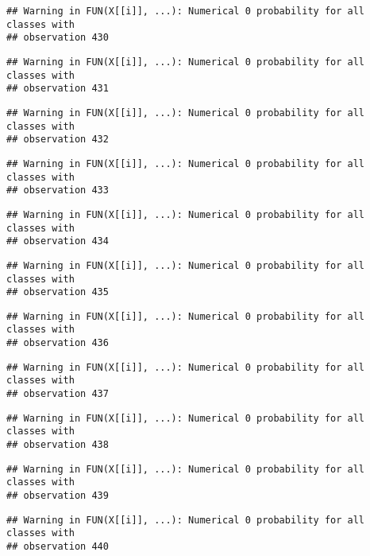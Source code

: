 \documentclass[
]{article}
\begin{document}
\begin{verbatim}
## Warning in FUN(X[[i]], ...): Numerical 0 probability for all classes with
## observation 430
\end{verbatim}

\begin{verbatim}
## Warning in FUN(X[[i]], ...): Numerical 0 probability for all classes with
## observation 431
\end{verbatim}

\begin{verbatim}
## Warning in FUN(X[[i]], ...): Numerical 0 probability for all classes with
## observation 432
\end{verbatim}

\begin{verbatim}
## Warning in FUN(X[[i]], ...): Numerical 0 probability for all classes with
## observation 433
\end{verbatim}

\begin{verbatim}
## Warning in FUN(X[[i]], ...): Numerical 0 probability for all classes with
## observation 434
\end{verbatim}

\begin{verbatim}
## Warning in FUN(X[[i]], ...): Numerical 0 probability for all classes with
## observation 435
\end{verbatim}

\begin{verbatim}
## Warning in FUN(X[[i]], ...): Numerical 0 probability for all classes with
## observation 436
\end{verbatim}

\begin{verbatim}
## Warning in FUN(X[[i]], ...): Numerical 0 probability for all classes with
## observation 437
\end{verbatim}

\begin{verbatim}
## Warning in FUN(X[[i]], ...): Numerical 0 probability for all classes with
## observation 438
\end{verbatim}

\begin{verbatim}
## Warning in FUN(X[[i]], ...): Numerical 0 probability for all classes with
## observation 439
\end{verbatim}

\begin{verbatim}
## Warning in FUN(X[[i]], ...): Numerical 0 probability for all classes with
## observation 440
\end{verbatim}
\end{document}
